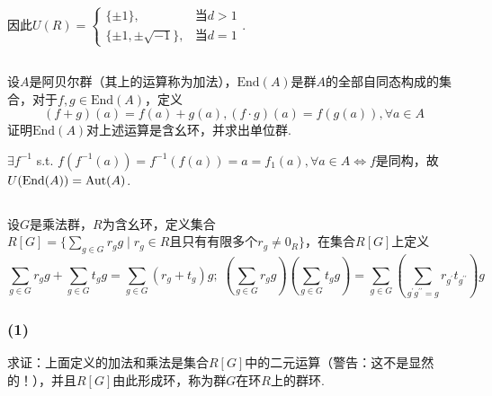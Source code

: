 因此$U(R)=\left\{
\begin{matrix}
\{\pm 1\}, & \text{当}d>1\\
\{\pm 1, \pm\sqrt{-1}\}, & \text{当}d=1
\end{matrix}
\right.$.

\subsection{}
设$A$是阿贝尔群（其上的运算称为加法），$\mathrm{End}(A)$是群$A$的全部自同态构成的集合，对于$f,g\in\mathrm{End}(A)$，定义
$$(f+g)(a)=f(a)+g(a), (f\cdot g)(a)=f(g(a)), \forall a\in A$$
证明$\mathrm{End}(A)$对上述运算是含幺环，并求出单位群.


\jie $\exists f^{-1}$ s.t. $f(f^{-1}(a))=f^{-1}(f(a))=a=f_1(a), \forall a\in A\Leftrightarrow
f$是同构，故$U(\mathrm{End}(A))=\operatorname{Aut}(A)$.

\subsection{}
设$G$是乘法群，$R$为含幺环，定义集合$R[G]=\{\sum_{g\in G}r_gg\mid r_g\in R\text{且只有有限多个}r_g\neq 0_R\}$，在集合$R[G]$上定义
$$\sum_{g\in G}r_gg+\sum_{g\in G}t_gg=\sum_{g\in G}(r_g+t_g)g;\;
\left(\sum_{g\in G}r_gg\right)\left(\sum_{g\in G}t_gg\right)=\sum_{g\in G}
\left(
\sum_{g^{\prime}g^{\prime\prime}=g}r_{g^{\prime}}t_{g^{\prime\prime}}
\right)g$$

\subsubsection{(1)}
求证：上面定义的加法和乘法是集合$R[G]$中的二元运算（警告：这不是显然的！），并且$R[G]$由此形成环，称为群$G$在环$R$上的{\heiti 群环}.

